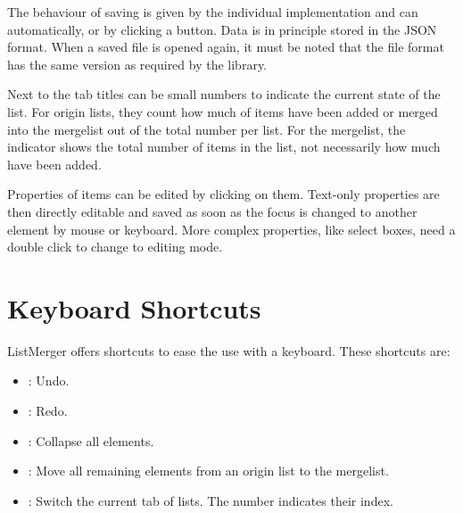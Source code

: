 The behaviour of saving is given by the individual implementation and
can automatically, or by clicking a  button. Data is in
principle stored in the JSON format. When a saved file is opened again,
it must be noted that the file format has the same version as required
by the library.

Next to the tab titles can be small numbers to indicate the current
state of the list. For origin lists, they count how much of items have
been added or merged into the mergelist out of the total number per
list. For the mergelist, the indicator shows the total number of items
in the list, not necessarily how much have been added.

Properties of items can be edited by clicking on them. Text-only
properties are then directly editable and saved as soon as the focus is
changed to another element by mouse or keyboard. More complex
properties, like select boxes, need a double click to change to editing
mode.


\section{Keyboard Shortcuts}
ListMerger offers shortcuts to ease the use with a keyboard. These
shortcuts are:
\begin{itemize}
    \item {}: Undo.
    \item {}: Redo.
    \item {}: Collapse all  elements.
    \item {}: Move all remaining elements from an origin list
      to the mergelist.
    \item \liintro{[1-9]}: Switch the current tab of lists. The number
      indicates their index.
\end{itemize}

